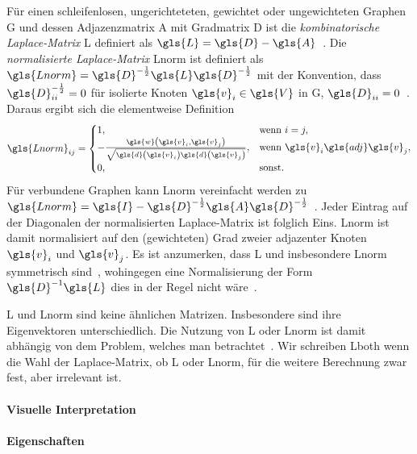 Für einen schleifenlosen, ungerichteteten, gewichtet oder ungewichteten Graphen \gls{G} und dessen Adjazenzmatrix \gls{A} mit Gradmatrix \gls{D} ist die \emph{kombinatorische Laplace-Matrix} \gls{L} definiert als $\gls{L} = \gls{D} - \gls{A}$~\cite{Chung}.
Die \emph{normalisierte Laplace-Matrix} \gls{Lnorm} ist definiert als $\gls{Lnorm} = \gls{D}^{-\frac{1}{2}} \gls{L} \gls{D}^{-\frac{1}{2}}$ mit der Konvention, dass $\gls{D}^{-\frac{1}{2}}_{ii} = 0$ für isolierte Knoten $\gls{v}_i \in \gls{V}$ in \gls{G}, \dhe{} $\gls{D}_{ii} = 0$~\cite{Chung}.
Daraus ergibt sich die elementweise Definition
\begin{equation*}
  \gls{Lnorm}_{ij} = \begin{cases}
  1, & \text{wenn }i = j,\\
    -\frac{\gls{w}\left(\gls{v}_i, \gls{v}_j\right)}{\sqrt{\gls{d}\left(\gls{v}_i\right)\gls{d}\left(\gls{v}_j\right)}}, & \text{wenn }\gls{v}_i \gls{adj} \gls{v}_j,\\
  0, & \text{sonst.}
\end{cases}
\end{equation*}
Für verbundene Graphen kann \gls{Lnorm} vereinfacht werden zu $\gls{Lnorm} = \gls{I} - \gls{D}^{-\frac{1}{2}} \gls{A} \gls{D}^{-\frac{1}{2}}$~\cite{Chung}.
Jeder Eintrag auf der Diagonalen der normalisierten Laplace-Matrix ist folglich Eins.
\gls{Lnorm} ist damit normalisiert auf den (gewichteten) Grad zweier adjazenter Knoten $\gls{v}_i$ und $\gls{v}_j$.
Es ist anzumerken, dass \gls{L} und insbesondere \gls{Lnorm} symmetrisch sind~\cite{Chung}, wohingegen eine Normalisierung der Form $\gls{D}^{-1}\gls{L}$ dies in der Regel nicht wäre~\cite{Reuter}.

\gls{L} und \gls{Lnorm} sind keine ähnlichen Matrizen.
Insbesondere sind ihre Eigenvektoren unterschiedlich.
Die Nutzung von \gls{L} oder \gls{Lnorm} ist damit abhängig von dem Problem, welches man betrachtet~\cite{Hammond}.
Wir schreiben \gls{Lboth} wenn die Wahl der Laplace-Matrix, ob \gls{L} oder \gls{Lnorm}, für die weitere Berechnung zwar fest, aber irrelevant ist.

\paragraph{Visuelle Interpretation}
\label{laplace_interpretation}


\paragraph{Eigenschaften}
\label{laplace_eigenschaften}

